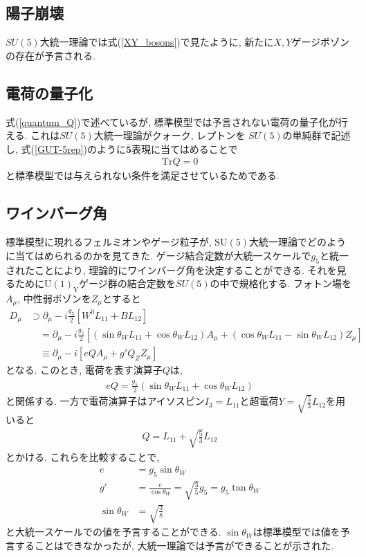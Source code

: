\subsection{陽子崩壊}
$SU(5)$大統一理論では式(\ref{XY_bosons})で見たように, 新たに$X, Y$ゲージボゾンの存在が予言される.
\subsection{電荷の量子化}
式(\ref{quantum_Q})で述べているが, 標準模型では予言されない電荷の量子化が行える.
これは$SU(5)$大統一理論がクォーク, レプトンを $SU(5)$の単純群で記述し, 式(\ref{GUT-5rep})のように$\overline{\bm{5}}$表現に当てはめることで
\begin{align}
  \mathrm{Tr}Q = 0 \nonumber
\end{align}
と標準模型では与えられない条件を満足させているためである.
\subsection{ワインバーグ角}
標準模型に現れるフェルミオンやゲージ粒子が, $\mathrm{SU(5)}$大統一理論でどのように当てはめられるのかを見てきた.
ゲージ結合定数が大統一スケールで$g_5$と統一されたことにより, 理論的にワインバーグ角を決定することができる.
それを見るために$\mathrm{U(1)_Y}$ゲージ群の結合定数を$SU(5)$の中で規格化する.
フォトン場を$A_\mu$, 中性弱ボゾンを$Z_\mu$とすると
\begin{align}
  D_\mu &\supset \partial_\mu -i\frac{g_5}{2}[W^0 L_{11} + B L_{12}]\nonumber\\
        &\quad=\partial_\mu -i\frac{g_5}{2}[(\sin\theta_W L_{11} + \cos\theta_W L_{12})A_\mu + (\cos\theta_W L_{11} -\sin\theta_W L_{12})Z_\mu]\nonumber\\
        &\quad\equiv \partial_\mu -i[eQA_\mu + g' Q_Z Z_\mu]\nonumber
\end{align}
となる.
このとき, 電荷を表す演算子$Q$は,
\begin{align}
  eQ = \frac{g_5}{2}(\sin\theta_W L_{11} + \cos\theta_W L_{12})\nonumber
\end{align}
と関係する.
一方で電荷演算子はアイソスピン$I_3 = L_{11}$と超電荷$Y=\sqrt{\frac{5}{3}}L_{12}$を用いると
\begin{align}
  Q = L_{11} + \sqrt{\frac{5}{3}}L_{12}\nonumber
\end{align}
とかける.
これらを比較することで,
\begin{align}
  e &= g_5\sin\theta_W\nonumber\\
  g'&= \frac{e}{\cos\theta_W}=\sqrt{\frac{3}{5}}g_5 = g_5 \tan\theta_W\nonumber\\
  \sin\theta_W &=\sqrt{\frac{3}{8}}\nonumber
\end{align}
と大統一スケールでの値を予言することができる.
$\sin\theta_W$は標準模型では値を予言することはできなかったが, 大統一理論では予言ができることが示された.


